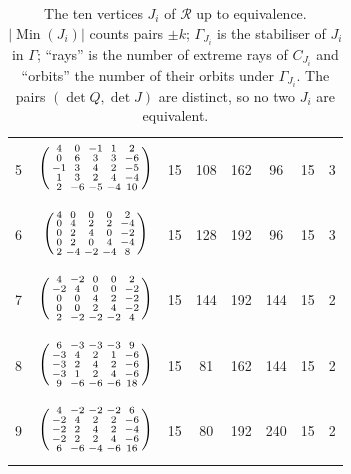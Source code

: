 \documentclass[11pt,reqno]{amsart}
\renewcommand{\_}{\origunderscore\allowbreak}
\numberwithin{equation}{section}
\theoremstyle{plain}
\theoremstyle{definition}
\theoremstyle{remark}
\newcommand{\Rk}{\mathcal{R}}
\newcommand{\Min}{\operatorname{Min}}
\begin{document}
\begin{table}[t]
\begin{tabular}{@{}c c c c c c c c@{}}
5 & $\vphantom{\rule[-19pt]{0pt}{42pt}}\left(\begin{smallmatrix}4&0&-1&1&2\\0&6&3&3&-6\\-1&3&4&2&-5\\1&3&2&4&-4\\2&-6&-5&-4&10\end{smallmatrix}\right)$ & 15 & 108 & 162 & 96 & 15 & 3\\
6 & $\vphantom{\rule[-19pt]{0pt}{42pt}}\left(\begin{smallmatrix}4&0&0&0&2\\0&4&2&2&-4\\0&2&4&0&-2\\0&2&0&4&-4\\2&-4&-2&-4&8\end{smallmatrix}\right)$ & 15 & 128 & 192 & 96 & 15 & 3\\
7 & $\vphantom{\rule[-19pt]{0pt}{42pt}}\left(\begin{smallmatrix}4&-2&0&0&2\\-2&4&0&0&-2\\0&0&4&2&-2\\0&0&2&4&-2\\2&-2&-2&-2&4\end{smallmatrix}\right)$ & 15 & 144 & 192 & 144 & 15 & 2\\
8 & $\vphantom{\rule[-19pt]{0pt}{42pt}}\left(\begin{smallmatrix}6&-3&-3&-3&9\\-3&4&2&1&-6\\-3&2&4&2&-6\\-3&1&2&4&-6\\9&-6&-6&-6&18\end{smallmatrix}\right)$ & 15 & 81 & 162 & 144 & 15 & 2\\
9 & $\vphantom{\rule[-19pt]{0pt}{42pt}}\left(\begin{smallmatrix}4&-2&-2&-2&6\\-2&4&2&2&-6\\-2&2&4&2&-4\\-2&2&2&4&-6\\6&-6&-4&-6&16\end{smallmatrix}\right)$ & 15 & 80 & 192 & 240 & 15 & 2\\
\bottomrule
\end{tabular}
\caption{The ten vertices $J_i$ of $\Rk$ up to equivalence. $|\Min(J_i)|$ counts pairs $\pm k$; $\Gamma_{J_i}$ is the stabiliser of $J_i$ in $\Gamma$; ``rays'' is the number of extreme rays of $C_{J_i}$ and ``orbits'' the number of their orbits under $\Gamma_{J_i}$. The pairs $(\det Q,\det J)$ are distinct, so no two $J_i$ are equivalent.}
\label{tab:vertices}
\end{table}
\end{document}

